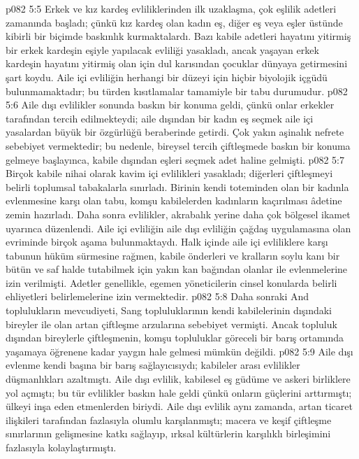 \vs p082 5:5 Erkek ve kız kardeş evliliklerinden ilk uzaklaşma, çok eşlilik adetleri zamanında başladı; çünkü kız kardeş olan kadın eş, diğer eş veya eşler üstünde kibirli bir biçimde baskınlık kurmaktalardı. Bazı kabile adetleri hayatını yitirmiş bir erkek kardeşin eşiyle yapılacak evliliği yasakladı, ancak yaşayan erkek kardeşin hayatını yitirmiş olan için dul karısından çocuklar dünyaya getirmesini şart koydu. Aile içi evliliğin herhangi bir düzeyi için hiçbir biyolojik içgüdü bulunmamaktadır; bu türden kısıtlamalar tamamiyle bir tabu durumudur.
\vs p082 5:6 Aile dışı evlilikler sonunda baskın bir konuma geldi, çünkü onlar erkekler tarafından tercih edilmekteydi; aile dışından bir kadın eş seçmek aile içi yasalardan büyük bir özgürlüğü beraberinde getirdi. Çok yakın aşinalık nefrete sebebiyet vermektedir; bu nedenle, bireysel tercih çiftleşmede baskın bir konuma gelmeye başlayınca, kabile dışından eşleri seçmek adet haline gelmişti.
\vs p082 5:7 Birçok kabile nihai olarak kavim içi evlilikleri yasakladı; diğerleri çiftleşmeyi belirli toplumsal tabakalarla sınırladı. Birinin kendi toteminden olan bir kadınla evlenmesine karşı olan tabu, komşu kabilelerden kadınların kaçırılması âdetine zemin hazırladı. Daha sonra evlilikler, akrabalık yerine daha çok bölgesel ikamet uyarınca düzenlendi. Aile içi evliliğin aile dışı evliliğin çağdaş uygulamasına olan evriminde birçok aşama bulunmaktaydı. Halk içinde aile içi evliliklere karşı tabunun hüküm sürmesine rağmen, kabile önderleri ve kralların soylu kanı bir bütün ve saf halde tutabilmek için yakın kan bağından olanlar ile evlenmelerine izin verilmişti. Adetler genellikle, egemen yöneticilerin cinsel konularda belirli ehliyetleri belirlemelerine izin vermektedir.
\vs p082 5:8 Daha sonraki And toplulukların mevcudiyeti, Sang topluluklarının kendi kabilelerinin dışındaki bireyler ile olan artan çiftleşme arzularına sebebiyet vermişti. Ancak topluluk dışından bireylerle çiftleşmenin, komşu topluluklar göreceli bir barış ortamında yaşamaya öğrenene kadar yaygın hale gelmesi mümkün değildi.
\vs p082 5:9 Aile dışı evlenme kendi başına bir barış sağlayıcısıydı; kabileler arası evlilikler düşmanlıkları azaltmıştı. Aile dışı evlilik, kabilesel eş güdüme ve askeri birliklere yol açmıştı; bu tür evlilikler baskın hale geldi çünkü onların güçlerini arttırmıştı; ülkeyi inşa eden etmenlerden biriydi. Aile dışı evlilik aynı zamanda, artan ticaret ilişkileri tarafından fazlasıyla olumlu karşılanmıştı; macera ve keşif çiftleşme sınırlarının gelişmesine katkı sağlayıp, ırksal kültürlerin karşılıklı birleşimini fazlasıyla kolaylaştırmıştı.
